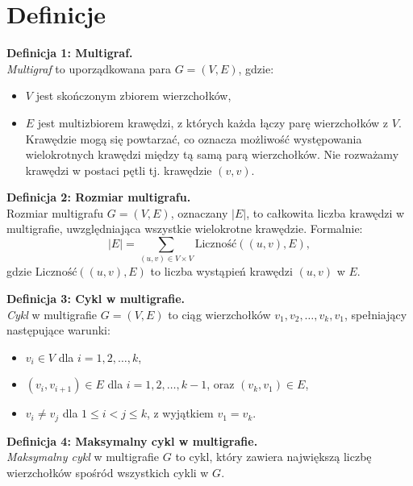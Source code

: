\section{Definicje}

\noindent \textbf{Definicja 1: Multigraf.} \\
\emph{Multigraf} to uporządkowana para \( G = (V, E) \), gdzie:
\begin{itemize}
    \item \( V \) jest skończonym zbiorem wierzchołków,
    \item \( E \) jest multizbiorem krawędzi, z których każda łączy parę wierzchołków z \( V \). Krawędzie mogą się powtarzać, co oznacza możliwość występowania wielokrotnych krawędzi między tą samą parą wierzchołków. Nie rozważamy krawędzi w postaci pętli tj. krawędzie \( (v, v) \).
\end{itemize}

\vspace{1em}

\noindent \textbf{Definicja 2: Rozmiar multigrafu.} \\
Rozmiar multigrafu \( G = (V, E) \), oznaczany \( |E| \), to całkowita liczba krawędzi w multigrafie, uwzględniająca wszystkie wielokrotne krawędzie. Formalnie:
\[
|E| = \sum_{(u, v) \in V \times V} \text{Liczność}((u, v), E),
\]
gdzie \( \text{Liczność}((u, v), E) \) to liczba wystąpień krawędzi \( (u, v) \) w \( E \).

\vspace{1em}

\noindent \textbf{Definicja 3: Cykl w multigrafie.} \\
\emph{Cykl} w multigrafie \( G = (V, E) \) to ciąg wierzchołków \( v_1, v_2, \dots, v_k, v_1 \), spełniający następujące warunki:
\begin{itemize}
    \item \( v_i \in V \) dla \( i = 1, 2, \dots, k \),
    \item \( (v_i, v_{i+1}) \in E \) dla \( i = 1, 2, \dots, k-1 \), oraz \( (v_k, v_1) \in E \),
    \item \( v_i \neq v_j \) dla \( 1 \leq i < j \leq k \), z wyjątkiem \( v_1 = v_k \).
\end{itemize}

\vspace{1em}

\noindent \textbf{Definicja 4: Maksymalny cykl w multigrafie.} \\
\emph{Maksymalny cykl} w multigrafie \( G \) to cykl, który zawiera największą liczbę wierzchołków spośród wszystkich cykli w \( G \).

